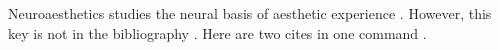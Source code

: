 \documentclass{article}
\begin{document}
Neuroaesthetics studies the neural basis of aesthetic experience \cite{realkey2020}.
However, this key is not in the bibliography \cite{missingkey}.
Here are two cites in one command \cite{realkey2020,missingkey}.
\end{document}
